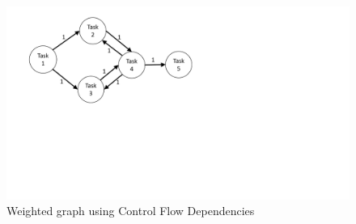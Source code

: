  
 \begin{figure}[h!]
 	\centering
 	\includegraphics[width=12cm, trim={1.5cm 9.0cm 13.0cm 0cm}]{img/ControlFlowGraph.pdf}
 	\caption{Weighted graph using Control Flow Dependencies}
 	\label{fig:controlFlowGraph}
 \end{figure}
 
 

\pagebreak

